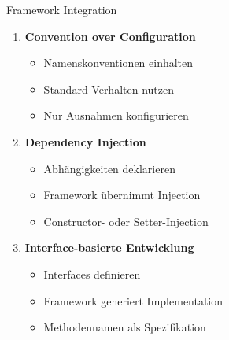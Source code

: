 \begin{KR}{Framework Integration}
\begin{enumerate}
    \item \textbf{Convention over Configuration}
    \begin{itemize}
        \item Namenskonventionen einhalten
        \item Standard-Verhalten nutzen
        \item Nur Ausnahmen konfigurieren
    \end{itemize}
    
    \item \textbf{Dependency Injection}
    \begin{itemize}
        \item Abhängigkeiten deklarieren
        \item Framework übernimmt Injection
        \item Constructor- oder Setter-Injection
    \end{itemize}
    
    \item \textbf{Interface-basierte Entwicklung}
    \begin{itemize}
        \item Interfaces definieren
        \item Framework generiert Implementation
        \item Methodennamen als Spezifikation
    \end{itemize}
\end{enumerate}
\end{KR}

